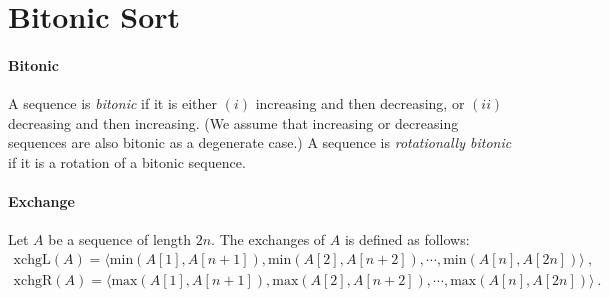 \documentclass[11pt,a4paper,oneside,microtype,chapter,nokorean]{oblivoir}
\begin{document}
\section{Bitonic Sort}

\paragraph{Bitonic} A sequence is \emph{bitonic} if it is either $(i)$ increasing and then
decreasing, or $(ii)$ decreasing and then increasing.  (We assume that increasing or decreasing
sequences are also bitonic as a degenerate case.)  A sequence is \emph{rotationally bitonic} if it
is a rotation of a bitonic sequence.


\paragraph{Exchange} Let $A$ be a sequence of length $2n$.  The exchanges of $A$ is defined as
follows:
\begin{align*}
  \textrm{xchgL}(A) = \langle \textrm{min}(A[1],A[n+1]), \textrm{min}(A[2],A[n+2]), \cdots, \textrm{min}(A[n],A[2n]) \rangle~, \\
  \textrm{xchgR}(A) = \langle \textrm{max}(A[1],A[n+1]), \textrm{max}(A[2],A[n+2]), \cdots, \textrm{max}(A[n],A[2n]) \rangle~.
\end{align*}
\end{document}
